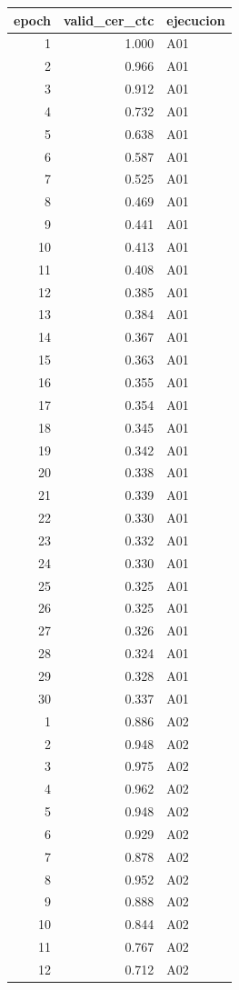 \begin{tabular}{rrl}
\toprule
epoch & valid_cer_ctc & ejecucion \\
\midrule
1 & 1.000 & A01 \\
2 & 0.966 & A01 \\
3 & 0.912 & A01 \\
4 & 0.732 & A01 \\
5 & 0.638 & A01 \\
6 & 0.587 & A01 \\
7 & 0.525 & A01 \\
8 & 0.469 & A01 \\
9 & 0.441 & A01 \\
10 & 0.413 & A01 \\
11 & 0.408 & A01 \\
12 & 0.385 & A01 \\
13 & 0.384 & A01 \\
14 & 0.367 & A01 \\
15 & 0.363 & A01 \\
16 & 0.355 & A01 \\
17 & 0.354 & A01 \\
18 & 0.345 & A01 \\
19 & 0.342 & A01 \\
20 & 0.338 & A01 \\
21 & 0.339 & A01 \\
22 & 0.330 & A01 \\
23 & 0.332 & A01 \\
24 & 0.330 & A01 \\
25 & 0.325 & A01 \\
26 & 0.325 & A01 \\
27 & 0.326 & A01 \\
28 & 0.324 & A01 \\
29 & 0.328 & A01 \\
30 & 0.337 & A01 \\
1 & 0.886 & A02 \\
2 & 0.948 & A02 \\
3 & 0.975 & A02 \\
4 & 0.962 & A02 \\
5 & 0.948 & A02 \\
6 & 0.929 & A02 \\
7 & 0.878 & A02 \\
8 & 0.952 & A02 \\
9 & 0.888 & A02 \\
10 & 0.844 & A02 \\
11 & 0.767 & A02 \\
12 & 0.712 & A02 \\

\end{tabular}
